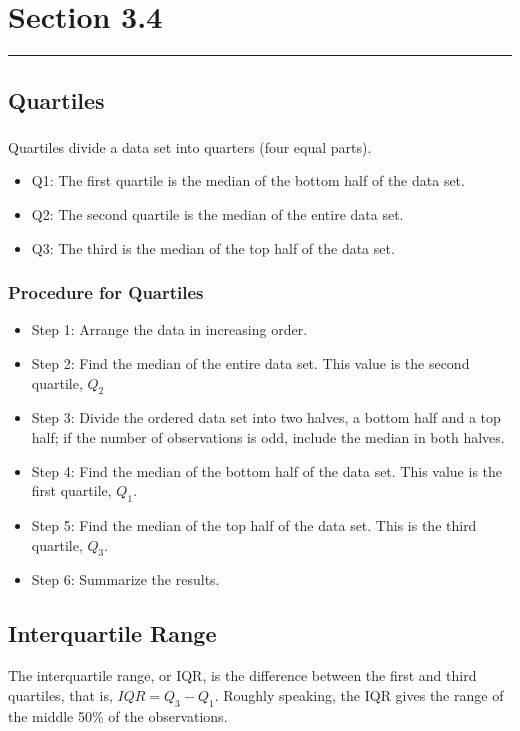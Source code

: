 \documentclass[12pt]{article}
\begin{document}
    \section*{Section 3.4}
    \noindent\rule{\textwidth}{0.4pt}
        \subsection*{Quartiles}
            \subsubsection*{}
                Quartiles divide a data set into quarters (four equal parts).
                \begin{itemize}
                    \item{Q1:} The first quartile is the median of the bottom half of the data set.
                    \item{Q2:} The second quartile is the median of the entire data set.
                    \item{Q3:} The third is the median of the top half of the data set.
                \end{itemize}
            \subsubsection*{Procedure for Quartiles}
                \begin{itemize}
                    \item{Step 1:} Arrange the data in increasing order.
                    \item{Step 2:} Find the median of the entire data set. This value is the second
                    quartile, \(Q_2\)
                    \item{Step 3:} Divide the ordered data set into two halves, a bottom half and a
                    top half; if the number of observations is odd, include the median in both halves.
                    \item{Step 4:} Find the median of the bottom half of the data set. This value is
                    the first quartile, \(Q_1\).
                    \item{Step 5:} Find the median of the top half of the data set. This is the third
                    quartile, \(Q_3\).
                    \item{Step 6:} Summarize the results.
                \end{itemize}
        \subsection*{Interquartile Range}
                The interquartile range, or IQR, is the difference between the first and third quartiles,
                that is, \(IQR = Q_3 - Q_1\). Roughly speaking, the IQR gives the range of the middle
                50\% of the observations.
\end{document}
